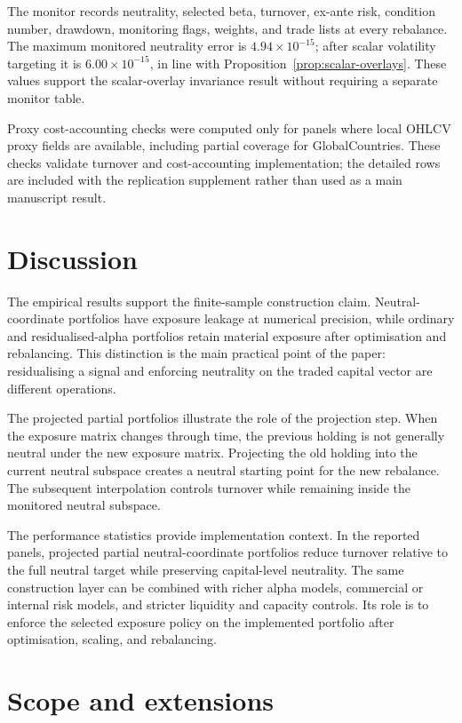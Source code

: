 \documentclass[11pt]{article}
\begin{document}
The monitor records neutrality, selected beta, turnover, ex-ante risk, condition number, drawdown,
monitoring flags, weights, and trade lists at every rebalance.  The maximum monitored neutrality error is
$4.94\times10^{-15}$; after scalar volatility targeting it is $6.00\times10^{-15}$, in line with
Proposition~\ref{prop:scalar-overlays}.  These values support the scalar-overlay invariance result without
requiring a separate monitor table.

Proxy cost-accounting checks were computed only for panels where local OHLCV proxy fields are
available, including partial coverage for GlobalCountries. These checks validate turnover and
cost-accounting implementation; the detailed rows are included with the replication supplement rather
than used as a main manuscript result.

\FloatBarrier
\section{Discussion}

The empirical results support the finite-sample construction claim.  Neutral-coordinate portfolios have
exposure leakage at numerical precision, while ordinary and residualised-alpha portfolios retain material
exposure after optimisation and rebalancing.  This distinction is the main practical point of the paper:
residualising a signal and enforcing neutrality on the traded capital vector are different operations.

The projected partial portfolios illustrate the role of the projection step.  When the exposure matrix
changes through time, the previous holding is not generally neutral under the new exposure matrix.
Projecting the old holding into the current neutral subspace creates a neutral starting point for the new
rebalance.  The subsequent interpolation controls turnover while remaining inside the monitored neutral
subspace.

The performance statistics provide implementation context.  In the reported panels, projected partial
neutral-coordinate portfolios reduce turnover relative to the full neutral target while preserving
capital-level neutrality.  The same construction layer can be combined with richer alpha models,
commercial or internal risk models, and stricter liquidity and capacity controls.  Its role is to enforce the
selected exposure policy on the implemented portfolio after optimisation, scaling, and rebalancing.

\section{Scope and extensions}
\end{document}
